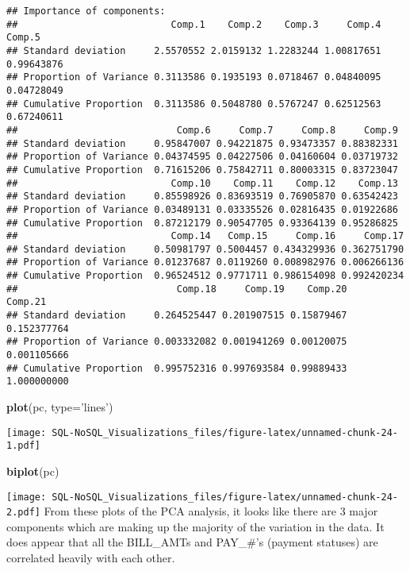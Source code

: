 \documentclass[]{article}
\newenvironment{Shaded}{\begin{snugshade}}{\end{snugshade}}
\newcommand{\KeywordTok}[1]{\textcolor[rgb]{0.13,0.29,0.53}{\textbf{#1}}}
\newcommand{\DataTypeTok}[1]{\textcolor[rgb]{0.13,0.29,0.53}{#1}}
\newcommand{\StringTok}[1]{\textcolor[rgb]{0.31,0.60,0.02}{#1}}
\newcommand{\NormalTok}[1]{#1}
\begin{document}
\begin{verbatim}
## Importance of components:
##                           Comp.1    Comp.2    Comp.3     Comp.4     Comp.5
## Standard deviation     2.5570552 2.0159132 1.2283244 1.00817651 0.99643876
## Proportion of Variance 0.3113586 0.1935193 0.0718467 0.04840095 0.04728049
## Cumulative Proportion  0.3113586 0.5048780 0.5767247 0.62512563 0.67240611
##                            Comp.6     Comp.7     Comp.8     Comp.9
## Standard deviation     0.95847007 0.94221875 0.93473357 0.88382331
## Proportion of Variance 0.04374595 0.04227506 0.04160604 0.03719732
## Cumulative Proportion  0.71615206 0.75842711 0.80003315 0.83723047
##                           Comp.10    Comp.11    Comp.12    Comp.13
## Standard deviation     0.85598926 0.83693519 0.76905870 0.63542423
## Proportion of Variance 0.03489131 0.03335526 0.02816435 0.01922686
## Cumulative Proportion  0.87212179 0.90547705 0.93364139 0.95286825
##                           Comp.14   Comp.15     Comp.16     Comp.17
## Standard deviation     0.50981797 0.5004457 0.434329936 0.362751790
## Proportion of Variance 0.01237687 0.0119260 0.008982976 0.006266136
## Cumulative Proportion  0.96524512 0.9771711 0.986154098 0.992420234
##                            Comp.18     Comp.19    Comp.20     Comp.21
## Standard deviation     0.264525447 0.201907515 0.15879467 0.152377764
## Proportion of Variance 0.003332082 0.001941269 0.00120075 0.001105666
## Cumulative Proportion  0.995752316 0.997693584 0.99889433 1.000000000
\end{verbatim}

\begin{Shaded}
\begin{Highlighting}[]
\KeywordTok{plot}\NormalTok{(pc, }\DataTypeTok{type=}\StringTok{'lines'}\NormalTok{)}
\end{Highlighting}
\end{Shaded}

\texttt{[image: SQL-NoSQL\_Visualizations\_files/figure-latex/unnamed-chunk-24-1.pdf]}

\begin{Shaded}
\begin{Highlighting}[]
\KeywordTok{biplot}\NormalTok{(pc)}
\end{Highlighting}
\end{Shaded}

\texttt{[image: SQL-NoSQL\_Visualizations\_files/figure-latex/unnamed-chunk-24-2.pdf]}
From these plots of the PCA analysis, it looks like there are 3 major
components which are making up the majority of the variation in the
data. It does appear that all the BILL\_AMTs and PAY\_\#'s (payment
statuses) are correlated heavily with each other.
\end{document}
